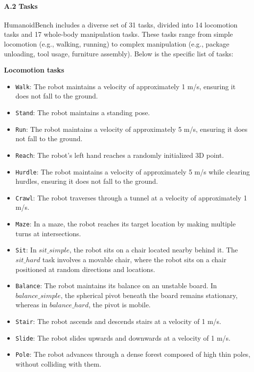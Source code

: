 \paragraph{A.2 Tasks}
HumanoidBench includes a diverse set of 31 tasks, divided into 14 locomotion tasks and 17 whole-body manipulation tasks. These tasks range from simple locomotion (e.g., walking, running) to complex manipulation (e.g., package unloading, tool usage, furniture assembly). Below is the specific list of tasks:

\textbf{Locomotion tasks}
\begin{itemize}
    \item \texttt{Walk}: The robot maintains a velocity of approximately 1 m/s, ensuring it does not fall to the ground.
    \item \texttt{Stand}: The robot maintains a standing pose.
    \item \texttt{Run}: The robot maintains a velocity of approximately 5 m/s, ensuring it does not fall to the ground.
    \item \texttt{Reach}: The robot's left hand reaches a randomly initialized 3D point.
    \item \texttt{Hurdle}: The robot maintains a velocity of approximately 5 m/s while clearing hurdles, ensuring it does not fall to the ground.
    \item \texttt{Crawl}: The robot traverses through a tunnel at a velocity of approximately 1 m/s.
    \item \texttt{Maze}: In a maze, the robot reaches its target location by making multiple turns at intersections.
    \item \texttt{Sit}: In $sit\_simple$, the robot sits on a chair located nearby behind it. The $sit\_hard$ task involves a movable chair, where the robot sits on a chair positioned at random directions and locations.
    \item \texttt{Balance}: The robot maintains its balance on an unstable board. In $balance\_simple$, the spherical pivot beneath the board remains stationary, whereas in $balance\_hard$, the pivot is mobile.
    \item \texttt{Stair}: The robot ascends and descends stairs at a velocity of 1 m/s.
    \item \texttt{Slide}: The robot slides upwards and downwards at a velocity of 1 m/s.
    \item \texttt{Pole}: The robot advances through a dense forest composed of high thin poles, without colliding with them.
\end{itemize}

